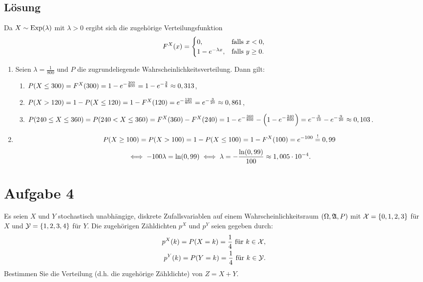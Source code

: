 \documentclass{exercise}
\begin{document}
    \subsection*{Lösung}
    Da \(X \sim \Exp\parentheses*{\lambda}\) mit \(\lambda > 0\) ergibt sich die zugehörige Verteilungsfunktion
    \[
        F^X\parentheses*{x} = \begin{cases}
            0, & \text{falls }x < 0,\\
            1 - e^{-\lambda x}, & \text{falls }y \ge 0.
        \end{cases}
    \]
    \begin{enumerate}
        \item Seien \(\lambda = \frac{1}{800}\) und \(P\) die zugrundeliegende Wahrscheinlichkeitsverteilung.
        Dann gilt:
        \begin{enumerate}
            \item \(P\parentheses*{X \le 300} = F^X\parentheses*{300} = 1 - e^{-\frac{300}{800}} = 1 - e^{-\frac{3}{8}} \approx 0,313\),
            \item \(P\parentheses*{X > 120} = 1 - P\parentheses*{X \le 120} = 1 - F^X\parentheses*{120} = e^{-\frac{120}{800}} = e^{-\frac{3}{20}} \approx 0,861\),
            \item \(P\parentheses*{240 \le X \le 360} = P\parentheses*{240 < X \le 360} = F^X\parentheses*{360} - F^X\parentheses*{240} = 1 - e^{-\frac{360}{800}} - \parentheses*{1 - e^{-\frac{240}{800}}} = e^{-\frac{3}{10}} - e^{-\frac{9}{20}} \approx 0,103\).
        \end{enumerate}
        \item
        \[
            P\parentheses*{X \ge 100} = P\parentheses*{X > 100} = 1 - P\parentheses*{X \le 100} = 1 - F^X\parentheses*{100} = e^{-100} \stackrel{!}{=} 0,99
        \]
        \[
            \iff -100\lambda = \ln\parentheses*{0,99} \iff \lambda = -\frac{\ln\parentheses*{0,99}}{100} \approx 1,005 \cdot 10^{-4}.
        \]
    \end{enumerate}


    \section*{Aufgabe 4}

    \begin{problem}
        Es seien \(X\) und \(Y\) stochastisch unabhängige, diskrete Zufallsvariablen auf einem Wahrscheinlichkeitsraum \(\parentheses*{\Omega, \mathfrak{A}, P}\) mit \(\mathcal{X} = \braces*{0, 1, 2, 3}\) für \(X\) und \(\mathcal{Y} = \braces*{1, 2, 3, 4}\) für \(Y\).
        Die zugehörigen Zähldichten \(p^X\) und \(p^Y\) seien gegeben durch:
        \begin{align*}
            p^X\parentheses*{k} = P\parentheses*{X = k} = \frac{1}{4}\text{ für }k \in \mathcal{X},\\
            p^Y\parentheses*{k} = P\parentheses*{Y = k} = \frac{1}{4}\text{ für }k \in \mathcal{Y}.
        \end{align*}
        Bestimmen Sie die Verteilung (d.h. die zugehörige Zähldichte) von \(Z = X + Y\).
    \end{problem}
\end{document}
